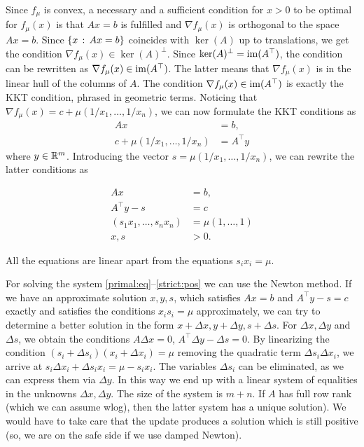 Since $f_\mu$ is convex, a necessary and a sufficient condition for $x >0$ to be optimal for $f_\mu(x)$ is that $Ax =b$ is fulfilled and $\nabla f_\mu(x)$ is orthogonal to the space $A x =b$. Since $\left\{ x \,:\, A x =b \right\}$ coincides with $\ker(A)$ up to translations, we get the condition $\nabla f_\mu(x) \in \ker(A)^\perp$. Since $\ker(A)^\perp = \operatorname{im}(A^\top)$, the condition can be rewritten as $\nabla f_\mu(x) \in \operatorname{im}(A^\top)$. The latter means that $\nabla f_\mu(x)$ is in the linear hull of the columns of $A$. The condition $\nabla f_\mu(x) \in \operatorname{im}(A^\top)$ is exactly the KKT condition, phrased in geometric terms. Noticing that $\nabla f_\mu(x) = c+ \mu (1/x_1,\ldots,1/x_n)$, we can now formulate the KKT conditions as
\begin{align*}
	A x & = b,
	\\ 	c+ \mu (1/x_1,\ldots,1/x_n) & = A^\top y
\end{align*}
where $y \in \mathbb{R}^m$. Introducing the vector $s= \mu (1/x_1,\ldots,1/x_n)$, we can rewrite the latter conditions as 

\begin{align}
	A x & = b, \label{primal:eq}
	\\ A^\top y - s & = c \label{dual:eq}
	\\ (s_1 x_1,\ldots,s_n x_n) & = \mu (1,\ldots,1) \label{mu:slack}
	\\ x, s & > 0. \label{strict:pos}
\end{align}

All the equations are linear apart from the equations $s_i x_i = \mu$. 


	For solving the system \eqref{primal:eq}--\eqref{strict:pos} we can use the Newton method. If we have an approximate solution $x, y, s$, which satisfies $A x = b$ and $A^\top y -s  =c$ exactly and satisfies the conditions $x_i s_i = \mu$ approximately, we can try to determine a better solution in the form $x + \Delta x, y + \Delta y, s + \Delta s$. For $\Delta x, \Delta y$ and $\Delta s$, we obtain the conditions $A \Delta x = 0$, $A^\top \Delta y - \Delta s = 0$. By linearizing the condition $(s_i + \Delta s_i) (x_i + \Delta x_i)  = \mu$ removing the quadratic term $\Delta s_i \Delta x_i$, we arrive at $s_i \Delta x_i + \Delta s_i x_i = \mu - s_i x_i$. The variables $\Delta s_i$ can be eliminated, as we can express them via $\Delta y$. In this way we end up with a linear system of equalities in the unknowns $\Delta x, \Delta y$. The size of the system is $m+n$. If $A$ has full row rank (which we can assume wlog), then the latter system has a unique solution). We would have to take care that the update produces a solution which is still positive (so, we are on the safe side if we use damped Newton). 


